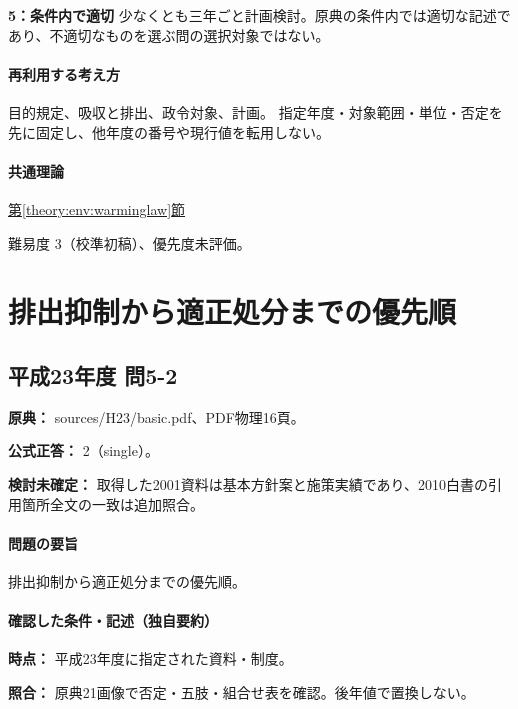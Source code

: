 \noindent\textbf{5：条件内で適切} 少なくとも三年ごと計画検討。原典の条件内では適切な記述であり、不適切なものを選ぶ問の選択対象ではない。\par

\paragraph{再利用する考え方} 目的規定、吸収と排出、政令対象、計画。 指定年度・対象範囲・単位・否定を先に固定し、他年度の番号や現行値を転用しない。

\paragraph{共通理論} \hyperref[theory:env:warminglaw]{第\ref*{theory:env:warminglaw}節}

\par 難易度 3（校準初稿）、優先度未評価。

\section{排出抑制から適正処分までの優先順}

\subsection{平成23年度 問5-2}
\label{q:h23-reg-basic-5-2}

\noindent\textbf{原典：} sources/H23/basic.pdf、PDF物理16頁。

\textbf{公式正答：} 2（single）。

\par\textbf{検討未確定：} 取得した2001資料は基本方針案と施策実績であり、2010白書の引用箇所全文の一致は追加照合。

\paragraph{問題の要旨} 排出抑制から適正処分までの優先順。

\paragraph{確認した条件・記述（独自要約）}\mbox{}\par

\noindent\textbf{時点：} 平成23年度に指定された資料・制度。\par

\noindent\textbf{照合：} 原典21画像で否定・五肢・組合せ表を確認。後年値で置換しない。\par

